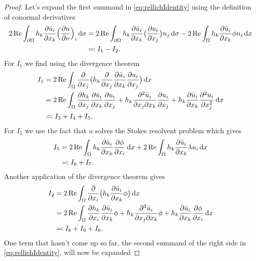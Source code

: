 \begin{proof}
  Let's expand the first summand in \eqref{eq:rellichIdentity} using the definition of conormal derivatives
  \begin{align*}
    2\operatorname{Re} \int_{\partial\Omega} h_k \frac{\partial \bar u_i}{\partial x_k} \Big( \frac{\partial u}{\partial \nu} \Big)_i \, {\operatorname{d}\!{\sigma}}
    &= 2 \operatorname{Re} \int_{\partial\Omega} h_k \frac{\partial \bar u_i}{\partial x_k} \big( \frac{\partial u_i}{\partial x_j} \big) n_j \, {\operatorname{d}\!{\sigma}}  - 2\operatorname{Re} \int_\Omega h_k \frac{\partial \bar u_i}{\partial x_k} \phi n_i \, {\operatorname{d}\!{x}} \\
    &\eqqcolon I_1 - I_2.
  \end{align*}
  For $I_1$ we find using the divergence theorem
  \begin{align*}
    I_1
    &= 2\operatorname{Re} \int_\Omega \frac{\partial}{\partial x_j} \big( h_k \frac{\partial}{\partial x_j} \frac{\partial \bar u_i}{\partial x_k} \frac{\partial u_i}{\partial x_j} \big) \, {\operatorname{d}\!{x}} \\
    &= 2\operatorname{Re} \int_\Omega \frac{\partial h_k}{\partial x_j} \frac{\partial \bar u_i}{\partial x_k} \frac{\partial u_i}{\partial x_j} + h_k \frac{\partial^2 \bar u_i}{\partial x_j \partial x_k} \frac{\partial u_i}{\partial x_j} + h_k \frac{\partial \bar u_i}{\partial x_k} \frac{\partial^2 u_i}{\partial x_j^2} \, {\operatorname{d}\!{x}} \\
    &\eqqcolon I_3 + I_4 + I_5.
  \end{align*}
  For $I_5$ we use the fact that $u$ solves the Stokes resolvent problem which gives
  \begin{align*}
     I_5 
     &= 2 \operatorname{Re} \int_\Omega h_k \frac{\partial \bar u_i}{\partial x_k} \frac{\partial \phi}{\partial x_i} \, {\operatorname{d}\!{x}} + 2\operatorname{Re} \int_\Omega h_k \frac{\partial\bar u_i}{\partial x_k} \lambda u_i \, {\operatorname{d}\!{x}} \\
     &\eqqcolon I_6 + I_7 .
  \end{align*}
  Another application of the divergence theorem gives
  \begin{align*}
    I_2
    &= 2 \operatorname{Re} \int_\Omega \frac{\partial}{\partial x_i} \big( h_k \frac{\partial \bar u_i}{\partial x_k} \phi \big) \, {\operatorname{d}\!{x}} \\
    &= 2 \operatorname{Re} \int_\Omega \frac{\partial h_k}{\partial x_i} \frac{\partial \bar u_i}{\partial x_k} \phi + h_k \frac{\partial^2 \bar u_i}{\partial x_j \partial x_k} \phi + h_k \frac{\partial \bar u_i}{\partial x_k} \frac{\partial \phi}{\partial x_i} \, {\operatorname{d}\!{x}}\\
    &\eqqcolon I_8 + I_9 + I_6.
  \end{align*}
  One term that hasn't come up so far, the second summand of the right side in \eqref{eq:rellichIdentity}, will now be expanded

\end{proof}
